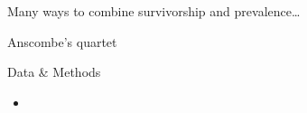 \documentclass[20pt,usenames,dvipsnames]{beamer}
\begin{document}






\begin{frame}[plain]
\Huge
\begin{center}
Many ways to combine survivorship and prevalence\ldots 
\end{center}
\end{frame}



\begin{frame}[plain]
\Huge
Anscombe's quartet
\end{frame}


\begin{frame}[plain]
\Large
\begin{block}{Data \& Methods}
\begin{itemize}[<+->]
\item 
\end{itemize}
\end{block}
\end{frame}





\end{document}

